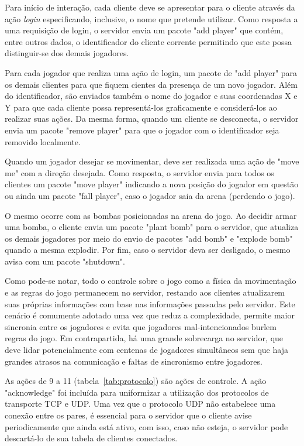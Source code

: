 \documentclass[12pt]{article}
\begin{document}
Para início de interação, cada cliente deve se apresentar para o cliente
através da ação \textit{login} especificando, inclusive, o nome que pretende
utilizar. Como resposta a uma requisição de login, o servidor envia um pacote
"add player" que contém, entre outros dados, o identificador do cliente
corrente permitindo que este possa distinguir-se dos demais jogadores.

Para cada jogador que realiza uma ação de login, um pacote de "add player" para
os demais clientes para que fiquem cientes da presença de um novo jogador. Além
do identificador, são enviados também o nome do jogador e suas coordenadas X e
Y para que cada cliente possa representá-los graficamente e considerá-los ao
realizar suas ações.  Da mesma forma, quando um cliente se desconecta, o
servidor envia um pacote "remove player" para que o jogador com o identificador
seja removido localmente.

Quando um jogador desejar se movimentar, deve ser realizada uma ação de "move
me" com a direção desejada. Como resposta, o servidor envia para todos os
clientes um pacote "move player" indicando a nova posição do jogador em questão
ou ainda um pacote "fall player", caso o jogador saia da arena (perdendo o
jogo).

O mesmo ocorre com as bombas posicionadas na arena do jogo. Ao decidir armar
uma bomba, o cliente envia um pacote "plant bomb" para o servidor, que atualiza
os demais jogadores por meio do envio de pacotes "add bomb" e "explode bomb"
quando a mesma explodir. Por fim, caso o servidor deva ser desligado, o mesmo
avisa com um pacote "shutdown".

Como pode-se notar, todo o controle sobre o jogo como a física da movimentação
e as regras do jogo permanecem no servidor, restando aos clientes atualizarem
suas próprias informações com base nas informações passadas pelo servidor. Este
cenário é comumente adotado uma vez que reduz a complexidade, permite maior
sincronia entre os jogadores e evita que jogadores mal-intencionados burlem
regras do jogo.
Em contrapartida, há uma grande sobrecarga no servidor, que deve
lidar potencialmente com centenas de jogadores simultâneos sem que haja grandes
atrasos na comunicação e faltas de sincronismo entre jogadores.

As ações de 9 a 11 (tabela~\ref{tab:protocolo}) são ações de controle. A ação
"acknowledge" foi incluída para uniformizar a utilização dos protocolos de
transporte TCP e UDP.  Uma vez que o protocolo UDP não estabelece uma conexão
entre os pares, é essencial para o servidor que o cliente avise periodicamente
que ainda está ativo, com isso, caso não esteja, o servidor pode descartá-lo de
sua tabela de clientes conectados.
\end{document}
